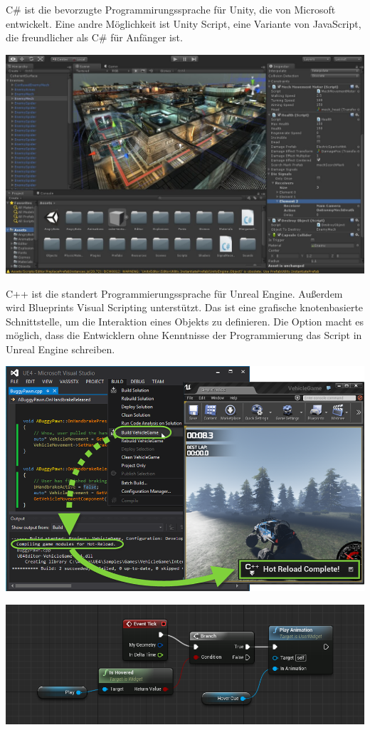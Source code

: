   C\# ist die bevorzugte Programmirungssprache für Unity, die von Microsoft entwickelt. Eine andre Möglichkeit ist Unity Script, eine Variante von JavaScript, die freundlicher als C\# für Anfänger ist.
  
  \includegraphics[width=\textwidth]{images/unity.jpg}
  
  C++ ist die standert Programmierungssprache für Unreal Engine. Außerdem wird Blueprints Visual Scripting unterstützt. Das ist eine grafische knotenbasierte Schnittstelle, um die Interaktion eines Objekts zu definieren. Die Option macht es möglich, dass die Entwicklern ohne Kenntnisse der Programmierung das Script in Unreal Engine schreiben.
  
  \includegraphics[width=\textwidth]{images/uec.png}
  
  \includegraphics[width=\textwidth]{images/ueblueprint.png}
  
